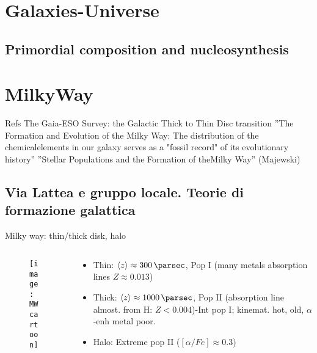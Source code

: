 \section{Galaxies-Universe}

\subsection{Primordial composition and nucleosynthesis}

\section{MilkyWay}

\begin{frame}{Refs}
The Gaia-ESO Survey: the Galactic Thick to Thin Disc transition
''The Formation and Evolution of the Milky Way: The distribution of the chemicalelements in our galaxy serves as a "fossil record" of its evolutionary history''
''Stellar Populations and the Formation of theMilky Way'' (Majewski)
\end{frame}

\subsection{Via Lattea e gruppo locale. Teorie di formazione galattica}

\begin{frame}{Milky way: thin/thick disk, halo}
\begin{columns}[T]
\begin{column}{0.5\textwidth}
\begin{figure}[!ht]\texttt{[image: MWcartoon]}\label{fig:MWcartoon}\end{figure}
\end{column}
\begin{column}{0.5\textwidth}
\begin{itemize}
\item Thin: $\exv{z}\approx\SI{300}{\parsec}$, Pop I (many metals absorption lines $Z\approx0.013$)
\item Thick: $\exv{z}\approx\SI{1000}{\parsec}$, Pop II (absorption line almost. from H: $Z<0.004$)-Int pop I; kinemat. hot, old, $\alpha$-enh metal poor.
\item Halo: Extreme pop II ($[\alpha/Fe]\approx0.3$)
\end{itemize}
\end{column}
\end{columns}
\end{frame}

